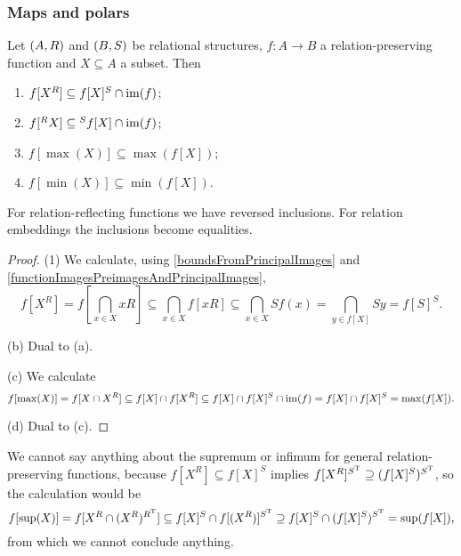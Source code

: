 \subsubsection{Maps and polars}

\begin{proposition} \label{imagePolars}
Let $\left( A, R \right)$ and $\left( B, S \right)$ be relational structures, $f: A\to B$ a relation-preserving function and $X\subseteq A$ a subset. Then
\begin{enumerate}
\item $f[X^R] \subseteq f[X]^S \cap \operatorname{im}(f)$;
\item $f[{^R}X] \subseteq {^Sf[X]} \cap \operatorname{im}(f)$;
\item $f[\max(X)] \subseteq \max(f[X])$;
\item $f[\min(X)] \subseteq \min(f[X])$.
\end{enumerate}
For relation-reflecting functions we have reversed inclusions. For relation embeddings the inclusions become equalities.
\end{proposition}
\begin{proof}
(1) We calculate, using \ref{boundsFromPrincipalImages} and \ref{functionImagesPreimagesAndPrincipalImages},
\[ f[X^R] = f\left[\bigcap_{x\in X}xR\right] \subseteq \bigcap_{x\in X}f[xR] \subseteq \bigcap_{x\in X}Sf(x) = \bigcap_{y\in f[X]} Sy =  f[S]^S. \]

(b) Dual to (a).

(c) We calculate
\[ f[\max(X)] = f[X\cap X^R] \subseteq f[X]\cap f[X^R] \subseteq f[X]\cap f[X]^S \cap \operatorname{im}(f) = f[X]\cap f[X]^S = \max(f[X]). \]

(d) Dual to (c).
\end{proof}
We cannot say anything about the supremum or infimum for general relation-preserving functions, because $f[X^R] \subseteq f[X]^S$ implies $f[X^R]^{S^{\mathrm{T}}} \supseteq (f[X]^S)^{S^{\mathrm{T}}}$, so the calculation would be
\[ f[\sup(X)] = f[X^R\cap (X^R)^{R^{\mathrm{T}}}] \subseteq f[X]^S \cap f[(X^R)]^{S^{\mathrm{T}}} \supseteq f[X]^S \cap (f[X]^S)^{S^{\mathrm{T}}} = \sup(f[X]), \]
from which we cannot conclude anything.

